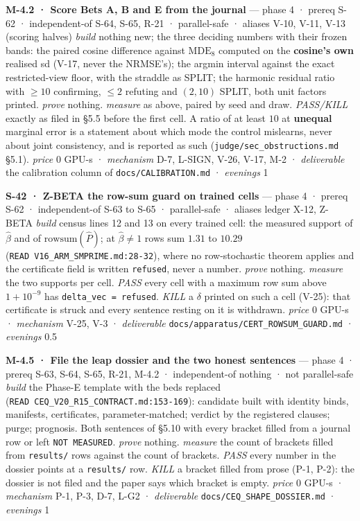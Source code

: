 \documentclass[11pt,a4paper]{article}
\theoremstyle{plain}
\theoremstyle{definition}
\theoremstyle{remark}
\begin{document}
\textbf{M-4.2 · Score Bets A, B and E from the journal} --- phase 4 ·
prereq S-62 · independent-of S-64, S-65, R-21 · parallel-safe · aliases
V-10, V-11, V-13 (scoring halves) \emph{build} nothing new; the three
deciding numbers with their frozen bands: the paired cosine difference
against \(\mathrm{MDE}_8\) computed on the \textbf{cosine's own}
realised sd (V-17, never the NRMSE's); the argmin interval against the
exact restricted-view floor, with the straddle as SPLIT; the harmonic
residual ratio with \(\ge10\) confirming, \(\le2\) refuting and
\((2,10)\) SPLIT, both unit factors printed. \emph{prove} nothing.
\emph{measure} as above, paired by seed and draw. \emph{PASS/KILL}
exactly as filed in §5.5 before the first cell. A ratio of at least
\(10\) at \textbf{unequal} marginal error is a statement about which
mode the control mislearns, never about joint consistency, and is
reported as such (\texttt{judge/sec\_obstructions.md} §5.1).
\emph{price} \(0\) GPU-s · \emph{mechanism} D-7, L-SIGN, V-26, V-17, M-2
· \emph{deliverable} the calibration column of
\texttt{docs/CALIBRATION.md} · \emph{evenings} 1

\textbf{S-42 · Z-BETA the row-sum guard on trained cells} --- phase 4 ·
prereq S-62 · independent-of S-63 to S-65 · parallel-safe · aliases
ledger X-12, Z-BETA \emph{build} census lines 12 and 13 on every trained
cell: the measured support of \(\hat\beta\) and of
\(\mathrm{rowsum}(\hat P)\); at \(\hat\beta\ne1\) rows sum \(1.31\) to
\(10.29\) (\texttt{READ\ V16\_ARM\_SMPRIME.md:28-32}), where no
row-stochastic theorem applies and the certificate field is written
\texttt{refused}, never a number. \emph{prove} nothing. \emph{measure}
the two supports per cell. \emph{PASS} every cell with a maximum row sum
above \(1+10^{-9}\) has \texttt{delta\_vec\ =\ refused}. \emph{KILL} a
\(\delta\) printed on such a cell (V-25): that certificate is struck and
every sentence resting on it is withdrawn. \emph{price} \(0\) GPU-s ·
\emph{mechanism} V-25, V-3 · \emph{deliverable}
\texttt{docs/apparatus/CERT\_ROWSUM\_GUARD.md} · \emph{evenings} 0.5

\textbf{M-4.5 · File the leap dossier and the two honest sentences} ---
phase 4 · prereq S-63, S-64, S-65, R-21, M-4.2 · independent-of nothing
· not parallel-safe \emph{build} the Phase-E template with the beds
replaced (\texttt{READ\ CEQ\_V20\_R15\_CONTRACT.md:153-169}): candidate
built with identity binds, manifests, certificates, parameter-matched;
verdict by the registered clauses; purge; prognosis. Both sentences of
§5.10 with every bracket filled from a journal row or left
\texttt{NOT\ MEASURED}. \emph{prove} nothing. \emph{measure} the count
of brackets filled from \texttt{results/} rows against the count of
brackets. \emph{PASS} every number in the dossier points at a
\texttt{results/} row. \emph{KILL} a bracket filled from prose (P-1,
P-2): the dossier is not filed and the paper says which bracket is
empty. \emph{price} \(0\) GPU-s · \emph{mechanism} P-1, P-3, D-7, L-G2 ·
\emph{deliverable} \texttt{docs/CEQ\_SHAPE\_DOSSIER.md} ·
\emph{evenings} 1
\end{document}
